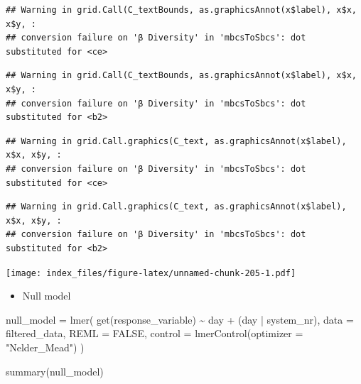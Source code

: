 \documentclass[
]{article}
\newenvironment{Shaded}{\begin{snugshade}}{\end{snugshade}}
\newcommand{\AttributeTok}[1]{\textcolor[rgb]{0.77,0.63,0.00}{#1}}
\newcommand{\ConstantTok}[1]{\textcolor[rgb]{0.00,0.00,0.00}{#1}}
\newcommand{\FunctionTok}[1]{\textcolor[rgb]{0.00,0.00,0.00}{#1}}
\newcommand{\NormalTok}[1]{#1}
\newcommand{\OtherTok}[1]{\textcolor[rgb]{0.56,0.35,0.01}{#1}}
\newcommand{\SpecialCharTok}[1]{\textcolor[rgb]{0.00,0.00,0.00}{#1}}
\newcommand{\StringTok}[1]{\textcolor[rgb]{0.31,0.60,0.02}{#1}}
\providecommand{\tightlist}{%
  \setlength{\itemsep}{0pt}\setlength{\parskip}{0pt}}
\begin{document}
\begin{verbatim}
## Warning in grid.Call(C_textBounds, as.graphicsAnnot(x$label), x$x, x$y, :
## conversion failure on 'β Diversity' in 'mbcsToSbcs': dot substituted for <ce>
\end{verbatim}

\begin{verbatim}
## Warning in grid.Call(C_textBounds, as.graphicsAnnot(x$label), x$x, x$y, :
## conversion failure on 'β Diversity' in 'mbcsToSbcs': dot substituted for <b2>
\end{verbatim}

\begin{verbatim}
## Warning in grid.Call.graphics(C_text, as.graphicsAnnot(x$label), x$x, x$y, :
## conversion failure on 'β Diversity' in 'mbcsToSbcs': dot substituted for <ce>
\end{verbatim}

\begin{verbatim}
## Warning in grid.Call.graphics(C_text, as.graphicsAnnot(x$label), x$x, x$y, :
## conversion failure on 'β Diversity' in 'mbcsToSbcs': dot substituted for <b2>
\end{verbatim}

\texttt{[image: index\_files/figure-latex/unnamed-chunk-205-1.pdf]}

\begin{itemize}
\tightlist
\item
  Null model
\end{itemize}

\begin{Shaded}
\begin{Highlighting}[]
\NormalTok{null\_model }\OtherTok{=} \FunctionTok{lmer}\NormalTok{(}
  \FunctionTok{get}\NormalTok{(response\_variable) }\SpecialCharTok{\textasciitilde{}}
\NormalTok{    day }\SpecialCharTok{+} 
\NormalTok{    (day }\SpecialCharTok{|}\NormalTok{ system\_nr), }
  \AttributeTok{data =}\NormalTok{ filtered\_data,}
  \AttributeTok{REML =} \ConstantTok{FALSE}\NormalTok{,}
  \AttributeTok{control =} \FunctionTok{lmerControl}\NormalTok{(}\AttributeTok{optimizer =} \StringTok{"Nelder\_Mead"}\NormalTok{)}
\NormalTok{)}

\FunctionTok{summary}\NormalTok{(null\_model)}
\end{Highlighting}
\end{Shaded}
\end{document}
